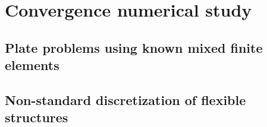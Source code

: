 \chapter{Convergence numerical study}\label{ch:conv}

\section{Plate problems using known mixed finite elements}

\section{Non-standard discretization of flexible structures}